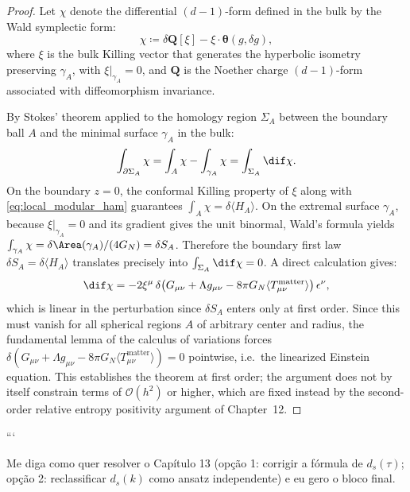 \begin{proof}
Let $\chi$ denote the differential $(d-1)$-form defined in the bulk by the Wald symplectic form:
\begin{equation}
    \chi \coloneqq \delta \mathbf{Q}[\xi] - \xi \cdot \mathbf{\theta}(g, \delta g),
\end{equation}
where $\xi$ is the bulk Killing vector that generates the hyperbolic isometry preserving $\gamma_A$, with $\xi|_{\gamma_A} = 0$, and $\mathbf{Q}$ is the Noether charge $(d-1)$-form associated with diffeomorphism invariance.

By Stokes' theorem applied to the homology region $\Sigma_A$ between the boundary ball $A$ and the minimal surface $\gamma_A$ in the bulk:
\begin{equation}
    \int_{\partial \Sigma_A} \chi = \int_A \chi - \int_{\gamma_A} \chi = \int_{\Sigma_A} \dif \chi.
\end{equation}
On the boundary $z = 0$, the conformal Killing property of $\xi$ along with \eqref{eq:local_modular_ham} guarantees $\int_A \chi = \delta \langle H_A \rangle$. On the extremal surface $\gamma_A$, because $\xi|_{\gamma_A} = 0$ and its gradient gives the unit binormal, Wald's formula yields $\int_{\gamma_A} \chi = \delta \Area(\gamma_A)/(4 G_N) = \delta S_A$. Therefore the boundary first law $\delta S_A = \delta \langle H_A \rangle$ translates precisely into $\int_{\Sigma_A} \dif \chi = 0$. A direct calculation gives:
\begin{equation}
    \dif \chi = -2 \xi^\mu\, \delta\!\left( G_{\mu\nu} + \Lambda g_{\mu\nu} - 8\pi G_N \langle T_{\mu\nu}^{\mathrm{matter}} \rangle \right) \mathbf{\epsilon}^\nu,
\end{equation}
which is linear in the perturbation since $\delta S_A$ enters only at first order. Since this must vanish for all spherical regions $A$ of arbitrary center and radius, the fundamental lemma of the calculus of variations forces $\delta(G_{\mu\nu} + \Lambda g_{\mu\nu} - 8\pi G_N \langle T_{\mu\nu}^{\mathrm{matter}}\rangle) = 0$ pointwise, i.e.\ the linearized Einstein equation. This establishes the theorem at first order; the argument does not by itself constrain terms of $\mathcal{O}(h^2)$ or higher, which are fixed instead by the second-order relative entropy positivity argument of Chapter~12.
\end{proof}
```

Me diga como quer resolver o Capítulo 13 (opção 1: corrigir a fórmula de $d_s(\tau)$; opção 2: reclassificar $d_s(k)$ como ansatz independente) e eu gero o bloco final.
